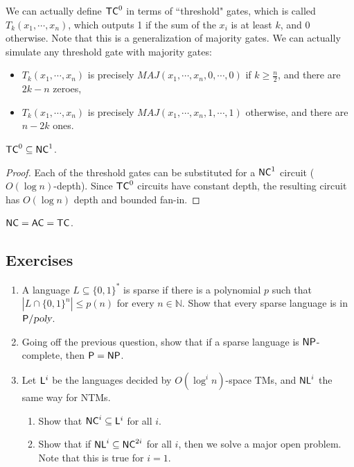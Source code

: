 We can actually define ${\mathsf{TC}}^0$ in terms of ``threshold" gates, which is called $T_k(x_1, \cdots, x_n)$, which outputs 1 if the sum of the $x_i$ is at least $k$, and 0 otherwise. Note that this is a generalization of majority gates. We can actually simulate any threshold gate with majority gates:
\begin{itemize}
\item $T_k(x_1, \cdots, x_n)$ is precisely $MAJ(x_1, \cdots, x_n, 0, \cdots, 0)$ if $k \ge \frac{n}{2}$, and there are $2k-n$ zeroes,
\item $T_k(x_1, \cdots, x_n)$ is precisely $MAJ(x_1, \cdots, x_n, 1, \cdots, 1)$ otherwise, and there are $n-2k$ ones.
\end{itemize}

\begin{theorem}
${\mathsf{TC}}^0 \subseteq {\ensuremath{\mathsf{NC}}}^1$. 
\end{theorem}
\begin{proof}
Each of the threshold gates can be substituted for a ${\mathsf{NC}}^1$ circuit ($O(\log n)$-depth). Since ${\mathsf{TC}}^0$ circuits have constant depth, the resulting circuit has $O(\log n)$ depth and bounded fan-in.
\end{proof}

\begin{corollary}
${\mathsf{NC}} = {\mathsf{AC}} = {\mathsf{TC}}$.
\end{corollary}

\subsection*{Exercises}

\begin{enumerate}
\item A language $L \subseteq \{0, 1\}^*$ is sparse if there is a polynomial $p$ such that $|L \cap \{0, 1\}^n| \le p(n)$ for every $n \in \mathbb{N}$. Show that every sparse language is in ${\mathsf{P}}/{\textsl{poly}}$.
\item Going off the previous question, show that if a sparse language is ${\mathsf{NP}}$-complete, then ${\mathsf{P}} = {\mathsf{NP}}$.
\item Let ${\mathsf{L}}^i$ be the languages decided by $O(\log^i n)$-space TMs, and ${\mathsf{NL}}^i$ the same way for NTMs.
\begin{enumerate}
\item Show that ${\mathsf{NC}}^i \subseteq {\ensuremath{\mathsf{L}}}^i$ for all $i$. %
\item Show that if ${\mathsf{NL}}^i \subseteq {\ensuremath{\mathsf{NC}}}^{2i}$ for all $i$, then we solve a major open problem. Note that this is true for $i=1$. %
\end{enumerate}
\end{enumerate}